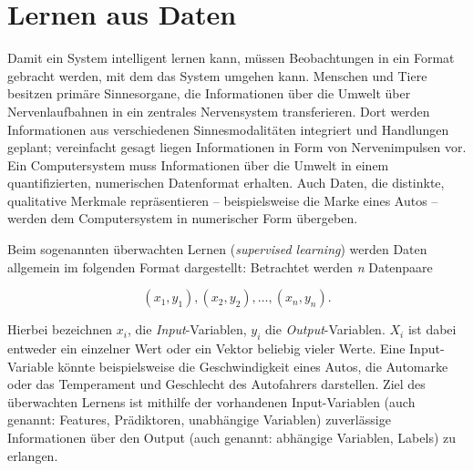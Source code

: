 \section{Lernen aus Daten}

Damit ein System intelligent lernen kann, müssen Beobachtungen in ein Format gebracht
werden, mit dem das System umgehen kann. Menschen und Tiere besitzen primäre
Sinnesorgane, die Informationen über die Umwelt über Nervenlaufbahnen in ein
zentrales Nervensystem transferieren. Dort werden Informationen aus verschiedenen
Sinnesmodalitäten integriert und Handlungen geplant; vereinfacht gesagt liegen
Informationen in Form von Nervenimpulsen vor. Ein Computersystem muss Informationen
über die Umwelt in einem quantifizierten, numerischen Datenformat erhalten. Auch
Daten, die distinkte, qualitative Merkmale repräsentieren -- beispielsweise die
Marke eines Autos -- werden dem Computersystem in numerischer Form übergeben.

Beim sogenannten überwachten Lernen (\emph{supervised learning}) werden Daten
allgemein im folgenden Format dargestellt: Betrachtet werden \emph{n} Datenpaare


\begin{equation*}
    (x_{1}, y_{1}), (x_{2},y_{2}), \ldots, (x_{n}, y_{n}).
\end{equation*}

Hierbei bezeichnen $x_{i}$, die \emph{Input}-Variablen, $y_{i}$
die \emph{Output}-Variablen. $X_{i}$ ist dabei entweder ein einzelner Wert
oder ein Vektor beliebig vieler Werte. Eine Input-Variable könnte beispielsweise die
Geschwindigkeit eines Autos, die Automarke oder das Temperament und Geschlecht des
Autofahrers darstellen. Ziel des überwachten Lernens ist mithilfe der vorhandenen
Input-Variablen (auch genannt: Features, Prädiktoren, unabhängige Variablen)
zuverlässige Informationen über den Output (auch genannt: abhängige Variablen,
Labels) zu erlangen.

